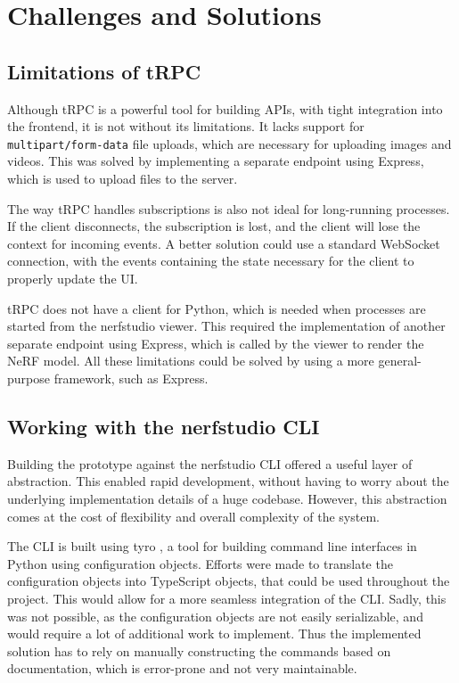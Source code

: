 \section{Challenges and Solutions}
\label{sec:system:challenges}

\subsection*{Limitations of tRPC}

Although tRPC is a powerful tool for building APIs, with tight integration into the frontend, it is not without its limitations.
It lacks support for \texttt{multipart/form-data} file uploads, which are necessary for uploading images and videos.
This was solved by implementing a separate endpoint using Express, which is used to upload files to the server.

The way tRPC handles subscriptions is also not ideal for long-running processes.
If the client disconnects, the subscription is lost, and the client will lose the context for incoming events.
A better solution could use a standard WebSocket connection, with the events containing the state necessary for the client to properly update the UI.

tRPC does not have a client for Python, which is needed when processes are started from the nerfstudio viewer.
This required the implementation of another separate endpoint using Express, which is called by the viewer to render the NeRF model.
All these limitations could be solved by using a more general-purpose framework, such as Express.

\subsection*{Working with the nerfstudio CLI}

Building the prototype against the nerfstudio CLI offered a useful layer of abstraction.
This enabled rapid development, without having to worry about the underlying implementation details of a huge codebase.
However, this abstraction comes at the cost of flexibility and overall complexity of the system.

The CLI is built using tyro \cite{yi_tyro_nodate}, a tool for building command line interfaces in Python using configuration objects.
Efforts were made to translate the configuration objects into TypeScript objects, that could be used throughout the project.
This would allow for a more seamless integration of the CLI.
Sadly, this was not possible, as the configuration objects are not easily serializable, and would require a lot of additional work to implement.
Thus the implemented solution has to rely on manually constructing the commands based on documentation, which is error-prone and not very maintainable.

